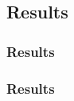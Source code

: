 \documentclass{beamer}
\begin{document}
\subsection{Results}
\begin{frame}
   \frametitle{Results}
   \begin{figure}
   		\centering
   \end{figure}
\end{frame}

\begin{frame}
   \frametitle{Results}
   \begin{figure}
   		\centering
   \end{figure}
\end{frame}
\end{document}
